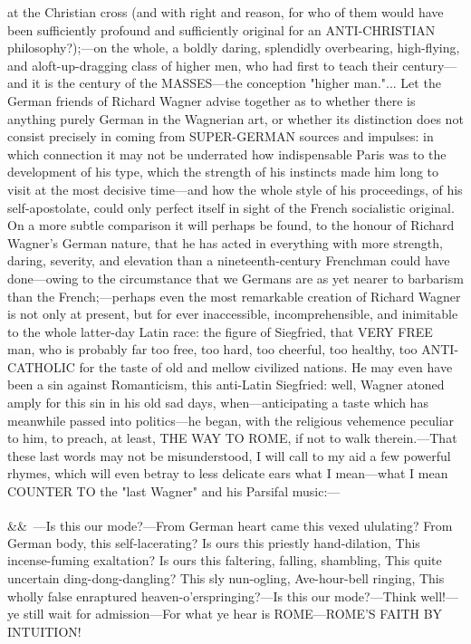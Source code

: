 \documentclass[12pt]{article}
\newcommand{\para}[1][]{\par\noindent\ifx&#1&\else\textsuperscript{\footnotesize #1}~\fi}
\begin{document}
at the Christian cross (and with right and reason, for who of them would have been sufficiently profound and sufficiently original for an ANTI-CHRISTIAN philosophy?);---on the whole, a boldly daring, splendidly overbearing, high-flying, and aloft-up-dragging class of higher men, who had first to teach their century---and it is the century of the MASSES---the conception "higher man."... Let the German friends of Richard Wagner advise together as to whether there is anything purely German in the Wagnerian art, or whether its distinction does not consist precisely in coming from SUPER-GERMAN sources and impulses: in which connection it may not be underrated how indispensable Paris was to the development of his type, which the strength of his instincts made him long to visit at the most decisive time---and how the whole style of his proceedings, of his self-apostolate, could only perfect itself in sight of the French socialistic original. On a more subtle comparison it will perhaps be found, to the honour of Richard Wagner's German nature, that he has acted in everything with more strength, daring, severity, and elevation than a nineteenth-century Frenchman could have done---owing to the circumstance that we Germans are as yet nearer to barbarism than the French;---perhaps even the most remarkable creation of Richard Wagner is not only at present, but for ever inaccessible, incomprehensible, and inimitable to the whole latter-day Latin race: the figure of Siegfried, that VERY FREE man, who is probably far too free, too hard, too cheerful, too healthy, too ANTI-CATHOLIC for the taste of old and mellow civilized nations. He may even have been a sin against Romanticism, this anti-Latin Siegfried: well, Wagner atoned amply for this sin in his old sad days, when---anticipating a taste which has meanwhile passed into politics---he began, with the religious vehemence peculiar to him, to preach, at least, THE WAY TO ROME, if not to walk therein.---That these last words may not be misunderstood, I will call to my aid a few powerful rhymes, which will even betray to less delicate ears what I mean---what I mean COUNTER TO the "last Wagner" and his Parsifal music:---

\para ---Is this our mode?---From German heart came this vexed ululating? From German body, this self-lacerating? Is ours this priestly hand-dilation, This incense-fuming exaltation? Is ours this faltering, falling, shambling, This quite uncertain ding-dong-dangling? This sly nun-ogling, Ave-hour-bell ringing, This wholly false enraptured heaven-o'erspringing?---Is this our mode?---Think well!---ye still wait for admission---For what ye hear is ROME---ROME'S FAITH BY INTUITION!
\end{document}
